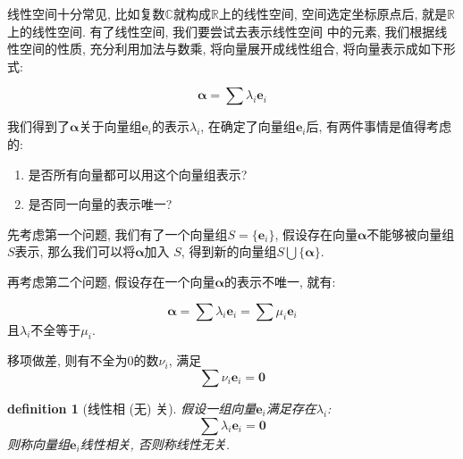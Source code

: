 \documentclass[12pt]{ctexbook}
\newtheorem{definition}{definition}
\numberwithin{definition}{section}
\numberwithin{theorem}{section}
\numberwithin{exercise}{section}
\numberwithin{example}{section}
\numberwithin{lemma}{section}
\begin{document}

    线性空间十分常见, 比如复数\(\mathbb{C}\)就构成\(\mathbb{R}\)上的线性空间, 空间选定坐标原点后, 就是\(\mathbb{R}\)上的线性空间. 有了线性空间, 我们要尝试去表示线性空间
    中的元素, 我们根据线性空间的性质, 充分利用加法与数乘, 将向量展开成线性组合, 将向量表示成如下形式:

    \begin{equation}
        \boldsymbol{\alpha} = \sum \lambda_i \boldsymbol{e}_i
    \end{equation}

    我们得到了\(\boldsymbol{\alpha}\)关于向量组\(\boldsymbol{e}_i\)的表示\(\lambda_i\),
    在确定了向量组\(\boldsymbol{e}_i\)后, 有两件事情是值得考虑的:

    \begin{enumerate}
        \item 是否所有向量都可以用这个向量组表示?
        \item 是否同一向量的表示唯一?
    \end{enumerate}
    
    先考虑第一个问题, 我们有了一个向量组\(S = \{\boldsymbol{e}_i\}\), 假设存在向量\(\boldsymbol{\alpha}\)不能够被向量组\(S\)表示, 那么我们可以将\(\boldsymbol{\alpha}\)加入
    \(S\), 得到新的向量组\(S \bigcup \{\boldsymbol{\alpha}\}\).

    再考虑第二个问题, 假设存在一个向量\(\boldsymbol{\alpha}\)的表示不唯一, 就有:

    \begin{equation}
        \boldsymbol{\alpha} = \sum \lambda_i \boldsymbol{e}_i = \sum \mu_i \boldsymbol{e}_i
    \end{equation}
    且\(\lambda_i\)不全等于\(\mu_i\).

    移项做差, 则有不全为0的数\(\nu_i\), 满足
    \begin{equation}
        \sum \nu_i \boldsymbol{e}_i = \boldsymbol{0} 
    \end{equation}

    \begin{definition}
        [线性相 (无) 关] 假设一组向量\(\boldsymbol{e}_i\)满足存在\(\lambda_i\):
        \begin{equation}
            \sum \lambda_i \boldsymbol{e}_i = \boldsymbol{0}
        \end{equation}
        则称向量组\(\boldsymbol{e}_i\)线性相关, 否则称线性无关.
    \end{definition}
\end{document}
